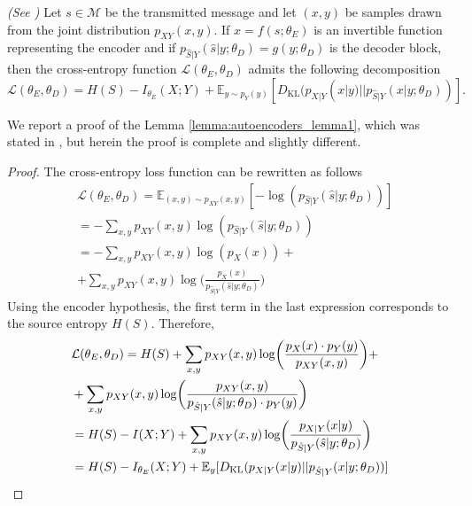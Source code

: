 \begin{lemma}\emph{(See \cite{Hoydis2019})}
\label{lemma:autoencoders_lemma1}
Let $s \in \mathcal{M}$ be the transmitted message and let $(x,y)$ be samples drawn from the joint distribution $p_{XY}(x,y)$. If $x = f(s;\theta_E)$ is an invertible function representing the encoder and if $p_{\hat{S}|Y}(\hat{s}|y;\theta_D) = g(y;\theta_D) $ is the decoder block, then the cross-entropy function $\mathcal{L}(\theta_E,\theta_D)$ admits the following decomposition
\begin{equation}
\mathcal{L}(\theta_E,\theta_D) = H(S)-I_{\theta_E}(X;Y)+\mathbb{E}_{y\sim p_Y(y)}[D_{\text{KL}}(p_{X|Y}(x|y)||p_{\hat{S}|Y}(x|y;\theta_D))].
\end{equation}
\end{lemma}
We report a proof of the Lemma \ref{lemma:autoencoders_lemma1}, which was stated in \cite{Hoydis2019}, but herein the proof is complete and slightly different.
\begin{proof}
The cross-entropy loss function can be rewritten as follows
\begin{align}
& \mathcal{L}(\theta_E,\theta_D) = \mathbb{E}_{(x,y)\sim p_{XY}(x,y)}[-\log(p_{\hat{S}|Y}(\hat{s}|y;\theta_D))] \\ \nonumber
&= -\sum_{x,y}{p_{XY}(x,y)\log(p_{\hat{S}|Y}(\hat{s}|y;\theta_D))} \\ \nonumber
&= -\sum_{x,y}{p_{XY}(x,y)\log(p_X(x))} + \\
&+ \sum_{x,y}{p_{XY}(x,y)\log\biggl(\frac{p_X(x)}{p_{\hat{S}|Y}(\hat{s}|y;\theta_D)}\biggr)} \nonumber
\end{align}
Using the encoder hypothesis, the first term in the last expression corresponds to the source entropy $H(S)$. Therefore,
\begin{align*}
&\mathcal{L}(\theta_E,\theta_D) = H(S) + \sum_{x,y}{p_{XY}(x,y)\log\biggl(\frac{p_X(x)\cdot p_Y(y)}{p_{XY}(x,y)}\biggr)}+\\ \nonumber
&+ \sum_{x,y}{p_{XY}(x,y)\log\biggl(\frac{p_{XY}(x,y)}{p_{\hat{S}|Y}(\hat{s}|y;\theta_D)\cdot p_Y(y)}\biggr)} \\ \nonumber
&= H(S)-I(X;Y)+\sum_{x,y}{p_{XY}(x,y)\log\biggl(\frac{p_{X|Y}(x|y)}{p_{\hat{S}|Y}(\hat{s}|y;\theta_D)}\biggr)} \\ \nonumber
&= H(S)-I_{\theta_E}(X;Y)+\mathbb{E}_{y}[D_{\text{KL}}(p_{X|Y}(x|y)|| p_{\hat{S}|Y}(x|y;\theta_D))] \qedhere \nonumber
\end{align*} 
\end{proof}

